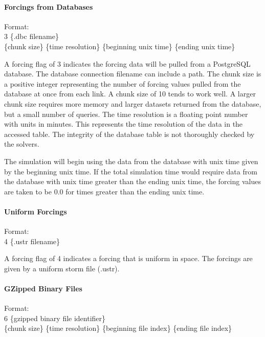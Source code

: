 \documentclass[12pt]{article}
\newenvironment{codeindent}
{\begin{list}{}
        {\setlength{\leftmargin}{.1in}}
        \item[]
}
{\end{list}}
\begin{document}
\paragraph{Forcings from Databases} \label{sec: forcings from db}
 
\begin{codeindent}
 Format: \\
 3 \{.dbc filename\} \\
 \{chunk size\} \{time resolution\} \{beginning unix time\} \{ending unix time\}
\end{codeindent}

A forcing flag of 3 indicates the forcing data will be pulled from a PostgreSQL database. The database connection filename can include a path. The chunk size is a positive integer representing the number of forcing values pulled from the database at once from each link. A chunk size of 10 tends to work well. A larger chunk size requires more memory and larger datasets returned from the database, but a small number of queries. The time resolution is a floating point number with units in minutes. This represents the time resolution of the data in the accessed table. The integrity of the database table is not thoroughly checked by the solvers.

The simulation will begin using the data from the database with unix time given by the beginning unix time. If the total simulation time would require data from the database with unix time greater than the ending unix time, the forcing values are taken to be 0.0 for times greater than the ending unix time.


\paragraph{Uniform Forcings} \label{sec: uniform forcings}
 
\begin{codeindent}
 Format: \\
 4 \{.ustr filename\} 
\end{codeindent}

A forcing flag of 4 indicates a forcing that is uniform in space. The forcings are given by a uniform storm file (.ustr).


\paragraph{GZipped Binary Files} \label{sec: gzipped binary files}

\begin{codeindent}
 Format: \\
 6 \{gzipped binary file identifier\} \\
 \{chunk size\} \{time resolution\} \{beginning file index\} \{ending file index\}
\end{codeindent}
 
\end{document}
